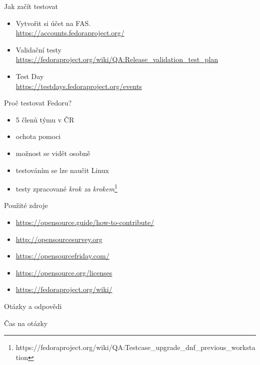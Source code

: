 \documentclass[11pt]{beamer}
\begin{document}
\begin{frame}{Jak začít testovat}
	\begin{itemize}
		\item Vytvořit si účet na FAS.\\
		\url{https://accounts.fedoraproject.org/}
		\item Validační testy \\ \url{https://fedoraproject.org/wiki/QA:Release_validation_test_plan}
		\item Test Day \\
		\url{https://testdays.fedoraproject.org/events}
	\end{itemize}
\end{frame}

\begin{frame}{Proč testovat Fedoru?}
	\begin{itemize}
		\item 5 členů týmu v ČR
		\item ochota pomoci
		\item možnost se vidět osobně
		\item testováním se lze naučit Linux
		\item testy zpracované \textit{krok za krokem}\footnote{https://fedoraproject.org/wiki/QA:Testcase\_upgrade\_dnf\_previous\_workstation}
	\end{itemize}
\end{frame}

 \begin{frame}{Použité zdroje}
	\begin{itemize}
		\item \url{https://opensource.guide/how-to-contribute/}
		\item \url{http://opensourcesurvey.org}
		\item \url{https://opensourcefriday.com/}
		\item \url{https://opensource.org/licenses}
		\item \url{https://fedoraproject.org/wiki/}
	\end{itemize}
\end{frame}


\begin{frame}{Otázky a odpovědi}
	\begin{center}
		{\Huge Čas na otázky} 
	\end{center}
\end{frame}
\end{document}

